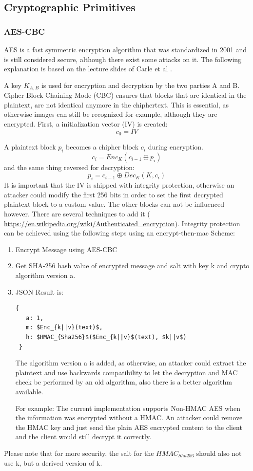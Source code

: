 \documentclass{scrartcl}
\begin{document}
 
\subsection{Cryptographic Primitives}
\subsubsection{AES-CBC \label{AESCBC}}
AES is a fast symmetric encryption algorithm that was standardized in 2001 and is still considered secure, although there exist some attacks on it. The following explanation is based on the lecture slides of Carle et al \cite{carle}.

A key $K_{A,B}$ is used for encryption and decryption by the two parties A and B. 
Cipher Block Chaining Mode (CBC) ensures that blocks that are identical in the plaintext, are not identical anymore in the chiphertext. This is essential, as otherwise images can still be recognized for example, although they are encrypted. First, a initialization vector (IV) is created:
$$
c_0 = IV
$$

A plaintext block $p_i$ becomes a chipher block $c_i$ during encryption.
$$
c_i = Enc_K(c_{i-1} \oplus p_i)
$$
and the same thing reversed for decryption:
$$
p_i = c_{i-1} \oplus Dec_K(K, c_i)
$$
It is important that the IV is shipped with integrity protection, otherwise an attacker could modify the first 256 bits in order to set the first decrypted plaintext block to a custom value. The other blocks can not be influenced however. 
There are several techniques to add it (
\url{https://en.wikipedia.org/wiki/Authenticated_encryption}).
 Integrity protection can be achieved using the following steps using an encrypt-then-mac Scheme:
\begin{enumerate}
\item Encrypt Message using AES-CBC
\item Get SHA-256 hash value of encrypted message and salt with key k and crypto algorithm version a.
\item JSON Result is:
\begin{lstlisting}[mathescape]
 { 
   a: 1,
   m: $Enc_{k||v}(text)$,
   h: $HMAC_{Sha256}$($Enc_{k||v}$(text), $k||v$)
 }
 \end{lstlisting}
  The algorithm version a is added, as otherwise, an attacker could extract the plaintext and use backwards compatibility to let the decryption and MAC check be performed by an old algorithm, also there is a better algorithm available.

For example: The current implementation supports Non-HMAC AES when the information was encrypted without a HMAC. An attacker could remove the HMAC key and just send the plain AES encrypted content to the client and the client would still decrypt it correctly.

\end{enumerate}
Please note that for more security, the salt for the $HMAC_{Sha256}$ should also not use k, but a derived version of k.
\end{document}
